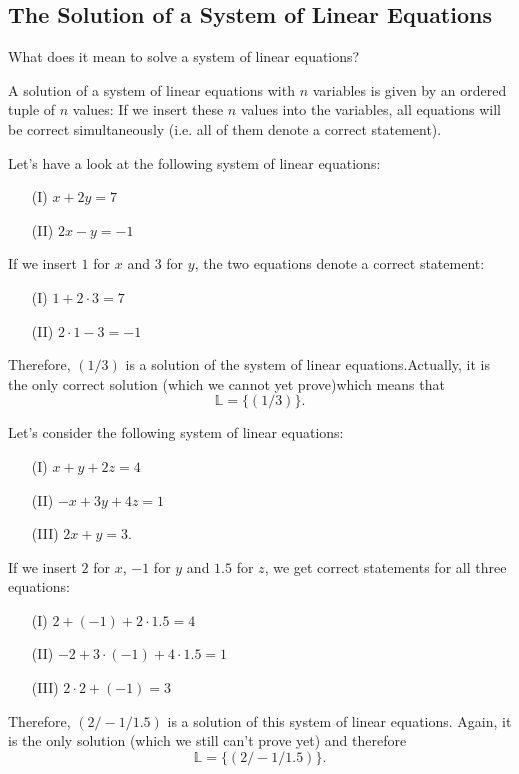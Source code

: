 \newpage

\subsection{The Solution of a System of Linear Equations}
What does it mean to solve a system of linear equations? 
\vsp

\begin{tcolorbox}[colback=white]\begin{definition}
A solution of a system of linear equations with $n$ variables is given by an ordered tuple of $n$ values: If we insert these $n$ values into the variables, all equations will be correct simultaneously (i.e. all of them denote a correct statement).
\end{definition}
\end{tcolorbox}
\vsp

\begin{example}
Let's have a look at the following system of linear equations:
\begin{itemize}
\item[(I)] $x+2y=7$
\item[(II)] $2x-y=-1$
\end{itemize}
If we insert $1$ for $x$ and $3$ for $y$, the two equations denote a correct statement:
\begin{itemize}
\item[(I)] $1+2\cdot 3=7$
\item[(II)] $2\cdot 1-3=-1$
\end{itemize}
Therefore, $(1/3)$ is a solution of the system of linear equations.Actually, it is the only correct solution (which we cannot yet prove)which means that
\[
\mathbb{L}=\{(1/3)\}.
\]
\end{example}
\vsp

\begin{example}
Let's consider the following system of linear equations:
\begin{itemize}
\item[(I)] $x+y+2z=4$
\item[(II)] $-x+3y+4z=1$
\item[(III)] $2x+y=3$.
\end{itemize}
If we insert $2$ for $x$, $-1$ for $y$ and $1.5$ for $z$, we get correct statements for all three equations:
\begin{itemize}
\item[(I)] $2+(-1)+2\cdot 1.5=4$
\item[(II)] $-2+3\cdot (-1)+4\cdot 1.5=1$
\item[(III)] $2\cdot 2+(-1)=3$
\end{itemize}
Therefore, $(2/-1/1.5)$ is a solution of this system of linear equations. Again, it is the only solution (which we still can't prove yet) and therefore
\[
\mathbb{L}=\{(2/-1/1.5)\}.
\]
\end{example}


